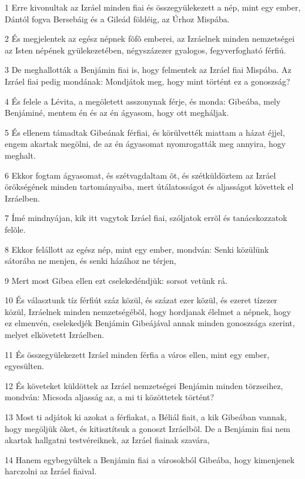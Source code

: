 \par 1 Erre kivonultak az Izráel minden fiai és összegyülekezett a nép, mint egy ember, Dántól fogva Bersebáig és a Gileád földéig, az Úrhoz Mispába.
\par 2 És megjelentek az egész népnek fõfõ emberei, az Izráelnek minden nemzetségei az Isten népének gyülekezetében, négyszázezer gyalogos, fegyverfogható férfiú.
\par 3 De meghallották a Benjámin fiai is, hogy felmentek az Izráel fiai Mispába. Az Izráel fiai pedig mondának: Mondjátok meg, hogy mint történt ez a gonoszság?
\par 4 És felele a Lévita, a megöletett asszonynak férje, és monda: Gibeába, mely Benjáminé, mentem én és az én ágyasom, hogy ott megháljak.
\par 5 És ellenem támadtak Gibeának férfiai, és körülvették miattam a házat éjjel, engem akartak megölni, de az én ágyasomat nyomrogatták meg annyira, hogy meghalt.
\par 6 Ekkor fogtam ágyasomat, és szétvagdaltam õt, és szétküldöztem az Izráel örökségének minden tartományaiba, mert útálatosságot és aljasságot követtek el Izráelben.
\par 7 Ímé mindnyájan, kik itt vagytok Izráel fiai, szóljatok errõl és tanácskozzatok felõle.
\par 8 Ekkor felállott az egész nép, mint egy ember, mondván: Senki közülünk sátorába ne menjen, és senki házához ne térjen,
\par 9 Mert most Gibea ellen ezt cselekedéndjük: sorsot vetünk rá.
\par 10 És választunk tíz férfiút száz közül, és százat ezer közül, és ezeret tízezer közül, Izráelnek minden nemzetségébõl, hogy hordjanak élelmet a népnek, hogy ez elmenvén, cselekedjék Benjámin Gibeájával annak minden gonoszsága szerint, melyet elkövetett Izráelben.
\par 11 És összegyülekezett Izráel minden férfia a város ellen, mint egy ember, egyesülten.
\par 12 És követeket küldöttek az Izráel nemzetségei Benjámin minden törzseihez, mondván: Micsoda aljasság az, a mi ti közöttetek történt?
\par 13 Most ti adjátok ki azokat a férfiakat, a Béliál fiait, a kik Gibeában vannak, hogy megöljük õket, és kitisztítsuk a gonoszt Izráelbõl. De a Benjámin fiai nem akartak hallgatni testvéreiknek, az Izráel fiainak szavára,
\par 14 Hanem egybegyûltek a Benjámin fiai a városokból Gibeába, hogy kimenjenek harczolni az Izráel fiaival.
